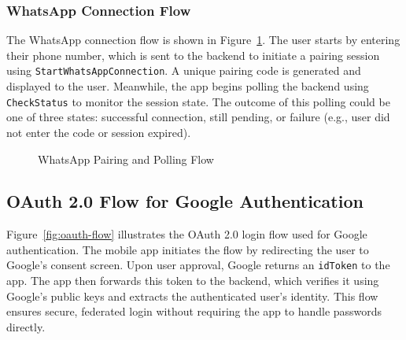 \subsubsection*{WhatsApp Connection Flow}

The WhatsApp connection flow is shown in Figure~\ref{fig:whatsapp-flow}. The user starts by entering their phone number, which is sent to the backend to initiate a pairing session using \texttt{StartWhatsAppConnection}. A unique pairing code is generated and displayed to the user. Meanwhile, the app begins polling the backend using \texttt{CheckStatus} to monitor the session state. The outcome of this polling could be one of three states: successful connection, still pending, or failure (e.g., user did not enter the code or session expired).

\begin{figure}[h!]
    \centering
    \caption{WhatsApp Pairing and Polling Flow}
    \label{fig:whatsapp-flow}
\end{figure}
    

\subsection*{OAuth 2.0 Flow for Google Authentication}

Figure~\ref{fig:oauth-flow} illustrates the OAuth 2.0 login flow used for Google authentication. The mobile app initiates the flow by redirecting the user to Google's consent screen. Upon user approval, Google returns an \texttt{idToken} to the app. The app then forwards this token to the backend, which verifies it using Google's public keys and extracts the authenticated user's identity. This flow ensures secure, federated login without requiring the app to handle passwords directly.

